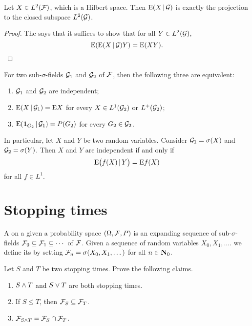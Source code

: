 
\begin{prop}
    Let $X \in L^2(\mathcal{F})$, which is a Hilbert space. Then $\mathop{}\!\mathrm{E}(X \,|\, \mathcal{G})$ is exactly the projection to the closed subspace $L^2(\mathcal{G})$.
\end{prop}
\begin{proof}
    The  says that it suffices to show that for all $Y \in L^2(\mathcal{G})$, \[
        \mathop{}\!\mathrm{E}(\mathop{}\!\mathrm{E}(X \,|\, \mathcal{G}) Y) = \mathop{}\!\mathrm{E}(XY).
    \]
\end{proof} 



\begin{prop}
    For two sub-$\sigma$-fields $\mathcal{G}_1$ and $\mathcal{G}_2$ of $\mathcal{F}$, then the following three are equivalent:
    \begin{enumerate}
        \item $\mathcal{G}_1$ and $\mathcal{G}_2$ are independent;
        \item \label{enu:indep-sub-sigma-fields} $\mathop{}\!\mathrm{E}(X\,|\, \mathcal{G}_1) = \mathop{}\!\mathrm{E} X$ for every $X \in L^1(\mathcal{G}_2)$ or $L^+(\mathcal{G}_2)$;
        \item $\mathop{}\!\mathrm{E}(\mathbf{1}_{G_2} \,|\, \mathcal G_1) = P(G_2)$ for every $G_2 \in \mathcal{G}_2$.
    \end{enumerate}
\end{prop}

In particular, let $X$ and $Y$ be two random variables. Consider $\mathcal{G}_1 = \sigma(X)$ and $\mathcal{G}_2 = \sigma(Y)$. Then $X$ and $Y$ are independent if and only if \[
    \mathop{}\!\mathrm{E}\bigl(f(X) \,|\, Y\bigr) = \mathop{}\!\mathrm{E} f(X)
\] for all $f \in L^1$.


\section{Stopping times}
A  on a given a probability space $(\Omega,\mathcal{F},P)$ is an expanding sequence of sub-$\sigma$-fields $\mathcal{F}_0 \subseteq \mathcal{F}_1\subseteq \dotsb$ of $\mathcal{F}$. Given a sequence of random variables $X_0, X_1, \dotsc$. we define its  by setting $\mathcal{F}_n = \sigma(X_0,X_1,\dotsc)$ for all $n\in \mathbf{N}_0$. 

\begin{xca}
Let $S$ and $T$ be two stopping times. Prove the following claims.
    \begin{enumerate}
        \item $S\land T$ and $S \lor T$ are both stopping times.
        \item If $S \leq T$, then $\mathcal{F}_S \subseteq \mathcal{F}_T$.
        \item $\mathcal{F}_{S\land T} = \mathcal{F}_S \cap \mathcal{F}_T$.
    \end{enumerate}
\end{xca}